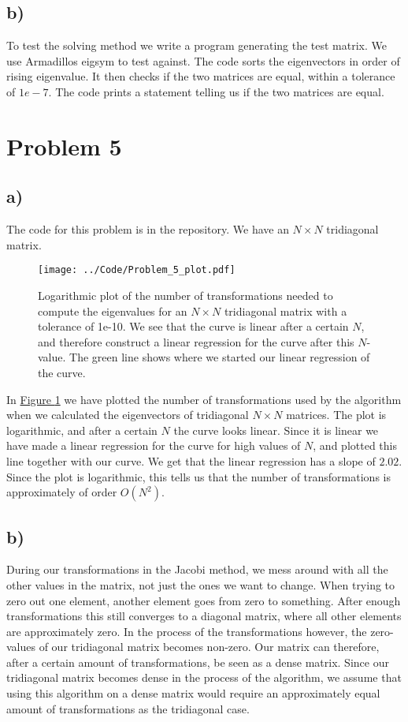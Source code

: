 \documentclass[english,notitlepage]{article}  %
\begin{document}
\subsection*{b)}
To test the solving method we write a program generating the test matrix. We use
Armadillos eigsym to test against. The code sorts the eigenvectors in order of
rising eigenvalue. It then checks if the two matrices are equal, within a tolerance
of $1e-7$. The code prints a statement telling us if the two matrices are equal.

\section*{Problem 5}
\subsection*{a)}
The code for this problem is in the repository.
We have an $N \times N$ tridiagonal matrix.

\begin{figure}[H]
    \centering
    \texttt{[image: ../Code/Problem\_5\_plot.pdf]}
    \caption{Logarithmic plot of the number of transformations needed to compute the eigenvalues for an $N \times N$ tridiagonal matrix with a tolerance of 1e-10. We see that the curve is linear after a certain $N$, and therefore construct a linear regression for the curve after this $N$-value. The green line shows where we started our linear regression of the curve.}
    \label{fig:5plot}
\end{figure}

In \hyperref[fig:5plot]{Figure \ref*{fig:5plot}} we have plotted the number of
transformations used by the algorithm when we calculated the eigenvectors of
tridiagonal $N \times N$ matrices. The plot is logarithmic, and after a certain
$N$ the curve looks linear. Since it is linear we have made a linear regression
for the curve for high values of $N$, and plotted this line together with our
curve. We get that the linear regression has a slope of $2.02$. Since the plot
is logarithmic, this tells us that the number of transformations is
approximately of order $O(N^2)$.


\subsection*{b)}
During our transformations in the Jacobi method, we mess around with all the
other values in the matrix, not just the ones we want to change. When trying to
zero out one element, another element goes from zero to something. After enough
transformations this still converges to a diagonal matrix, where all other
elements are approximately zero. In the process of the transformations however,
the zero-values of our tridiagonal matrix becomes non-zero. Our matrix can
therefore, after a certain amount of transformations, be seen as a dense matrix.
Since our tridiagonal matrix becomes dense in the process of the algorithm, we
assume that using this algorithm on a dense matrix would require an
approximately equal amount of transformations as the tridiagonal case.
\end{document}
